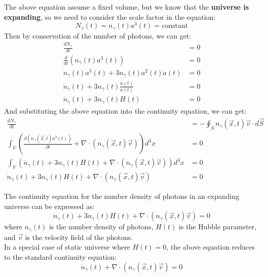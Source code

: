 \bigskip \noindent
\begin{foundation}
    The above equation assume a fixed volume, but we know that the \textbf{universe is expanding}, so we need to consider the scale factor in the equation:
    \[
        N_\gamma(t) = n_\gamma(t) a^3(t) = \text{constant}
    \]
    Then by conservation of the number of photons, we can get:
    \begin{align*}
        \frac{dN_\gamma}{dt} &= 0\\
        \frac{d}{dt} (n_\gamma(t) a^3(t)) &= 0 \\
        \dot{n}_\gamma(t) a^3(t) + 3 n_\gamma(t) a^2(t) \dot{a}(t) &= 0\\
        \dot{n}_\gamma(t) + 3 n_\gamma(t) \frac{\dot{a}(t)}{a(t)} &= 0 \\
        \dot{n}_\gamma(t) + 3 n_\gamma(t) H(t) &= 0
    \end{align*}
    And substituting the above equation into the continuity equation, we can get:
    \begin{align*}
        \frac{dN_\gamma}{dt} &= -\oint_S n_\gamma(\vec{x},t) \vec{v} \cdot d\vec{S} \\
        \int_V \left( \frac{\partial \left( n_\gamma(\vec{x},t) a^3(t) \right)}{\partial t} + \nabla \cdot (n_\gamma(\vec{x},t) \vec{v}) \right) d^3 x &= 0 \\
        \int_V \left( \dot{n}_\gamma(t) + 3 n_\gamma(t) H(t) + \nabla \cdot (n_\gamma(\vec{x},t) \vec{v}) \right) d^3 x &= 0 \\
        \dot{n}_\gamma(t) + 3 n_\gamma(t) H(t) + \nabla \cdot (n_\gamma(\vec{x},t) \vec{v}) &= 0
    \end{align*}
\end{foundation}

\bigskip \noindent
\begin{theory}
    The continuity equation for the number density of photons in an expanding universe can be expressed as:
    \[
        \dot{n}_\gamma(t) + 3 n_\gamma(t) H(t) + \nabla \cdot (n_\gamma(\vec{x},t) \vec{v}) = 0
    \]
    where $n_\gamma(t)$ is the number density of photons, $H(t)$ is the Hubble parameter, and $\vec{v}$ is the velocity field of the photons. \\

    In a special case of static universe where $H(t) = 0$, the above equation reduces to the standard continuity equation:
    \[
        \dot{n}_\gamma(t) + \nabla \cdot (n_\gamma(\vec{x},t) \vec{v}) = 0
    \]
\end{theory}


